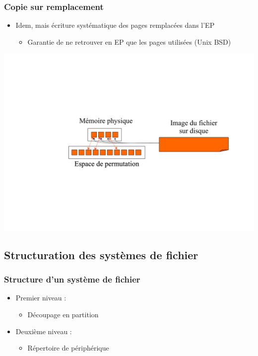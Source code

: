\begin{frame}
\frametitle{Copie sur remplacement}
\begin{itemize}
\item Idem, mais écriture systématique des pages remplacées dans l'EP
\begin{itemize}
\item Garantie de ne retrouver en EP que les pages utilisées (Unix BSD)
\end{itemize}
\end{itemize}
\includegraphics[width=.8\textwidth]{../illustration/mapping_copie_remplacement.pdf}
\end{frame}


\subsection{Structuration des systèmes de fichier}

\begin{frame}
\frametitle{Structure d'un système de fichier}
\begin{itemize}
\item Premier niveau :
\begin{itemize}
\item Découpage en partition
\end{itemize}
\item Deuxième niveau :
\begin{itemize}
\item Répertoire de périphérique
\end{itemize}
\end{itemize}
\end{frame}

